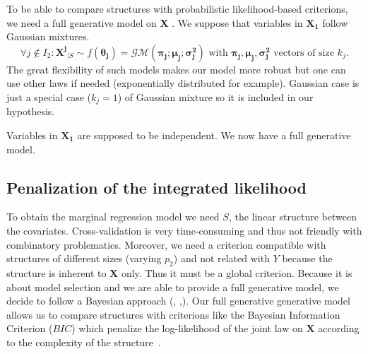 \documentclass[11pt,a4paper]{article}
\begin{document}
	To be able to compare structures with probabilistic likelihood-based criterions, we need a full generative model on $\boldsymbol{X}$ . We suppose that variables in $\boldsymbol{X_1}$ follow Gaussian mixtures. 
	\begin{equation}
			\forall j \notin I_2 : \boldsymbol{X^j}_{|S} \sim f(\boldsymbol{\theta_j})=\mathcal{GM}(\boldsymbol{\pi_j};\boldsymbol{\mu_j};\boldsymbol{\sigma^2_j}) \textrm{ with } \boldsymbol{\pi_j},\boldsymbol{\mu_j},\boldsymbol{\sigma^2_j} \textrm{ vectors of size } k_j. \label{mixtureX1}
		\end{equation}
		The great flexibility \cite{mclachlan2004finite} of such models makes our model more robust but one can use other laws if needed (exponentially distributed for example). Gaussian case is just a special case ($k_j=1$) of Gaussian mixture so it is included in our hypothesis.

		Variables in $\boldsymbol{X_1}$ are supposed to be independent.
	We now have a full generative model.
	\subsection{Penalization of the integrated likelihood} \label{compstruct}
  To obtain the marginal regression model we need $S$, the linear structure between the covariates.
  Cross-validation is very time-consuming and thus not friendly with combinatory problematics. Moreover, we need a criterion compatible with structures of different sizes (varying $p_2$) and not related with $Y$ because the structure is inherent to $\boldsymbol{X}$ only. Thus it must be a global criterion. 	
	Because it is about model selection and we are able to provide a full generative model, we decide to follow a Bayesian approach (\cite{raftery1995bayesian}, \cite{andrieu1999joint},\cite{chipman2001practical}).  
	Our full generative generative model allows us to compare structures with criterions like the Bayesian Information Criterion ($BIC$) which penalize the log-likelihood of the joint law on $\boldsymbol{X}$ according to the complexity of the structure~\cite{BIChuard}. 
\end{document}
